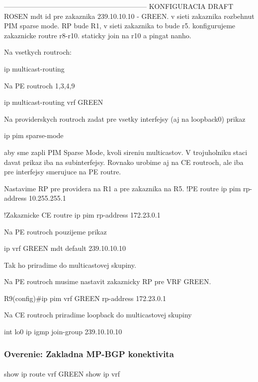 \documentclass[12pt,twoside,a4paper]{report}
\begin{document}
--------------------------------------------------------------
KONFIGURACIA DRAFT ROSEN
mdt id pre zakaznika 239.10.10.10 - GREEN. v sieti zakaznika rozbehnut PIM sparse mode. RP bude R1, v sieti zakaznika to bude r5. konfigurujeme zakaznicke routre r8-r10. staticky join na r10 a pingat nanho.


Na vsetkych routroch:

ip multicast-routing




Na PE routroch 1,3,4,9

ip multicast-routing vrf GREEN





Na providerskych routroch zadat pre vsetky interfejsy (aj na loopback0) prikaz

ip pim sparse-mode

aby sme zapli PIM Sparse Mode, kvoli sireniu multicastov. V trojuholniku staci davat prikaz iba na subinterfejsy. Rovnako urobime aj na CE routroch, ale iba pre interfejsy smerujuce na PE routre.






Nastavime RP pre providera na R1 a pre zakaznika na R5.
!PE routre
ip pim rp-address 10.255.255.1

!Zakaznicke CE routre
ip pim rp-address 172.23.0.1




Na PE routroch pouzijeme prikaz

ip vrf GREEN
  mdt default 239.10.10.10

Tak ho priradime do multicastovej skupiny.






Na PE routroch musime nastavit zakaznicky RP pre VRF GREEN.

R9(config)#ip pim vrf GREEN rp-address 172.23.0.1




Na CE routroch priradime loopback do multicastovej skupiny

int lo0
ip igmp join-group 239.10.10.10






\subsubsection{Overenie: Zakladna MP-BGP konektivita}
\paragraph{}
show ip route vrf GREEN
show ip vrf
\end{document}
